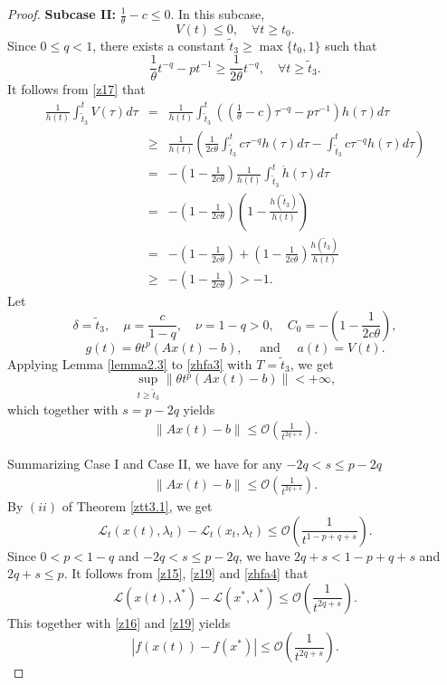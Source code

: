 \documentclass[review]{elsarticle}
\begin{document}
\begin{proof}
	{\bf Subcase II:}  $\frac{1}{\theta}-c\leq0$. In this subcase, 
	$$V(t)\leq0,  \quad \forall t\geq t_0.$$ 
	Since  $0\leq q<1$,  there exists a constant $\tilde{t}_3\geq \max\{t_0,1\}$ such that 
	$$\frac{1}{\theta}t^{-q}-pt^{-1}\geq\frac{1}{2\theta}t^{-q}, \quad \forall t\geq\tilde{t}_3.$$
It follows from \eqref{z17} that
	\begin{eqnarray*}
		\frac{1}{h(t)}\int_{\tilde{t}_3}^{t}V(\tau)d\tau&=&\frac{1}{h(t)}\int_{\tilde{t}_3}^{t}\left(\left(\frac{1}{\theta}-c\right)\tau^{-q}-p\tau^{-1}\right)h(\tau)d\tau\\
		&\geq&\frac{1}{h(t)}\left(\frac{1}{2c\theta}\int_{\tilde{t}_3}^{t}c\tau^{-q}h(\tau)d\tau-\int_{\tilde{t}_3}^{t}c\tau^{-q}h(\tau)d\tau\right)\\
		&=&-\left(1-\frac{1}{2c\theta}\right)\frac{1}{h(t)}\int_{\tilde{t}_3}^{t}\dot{h}(\tau)d\tau\\
		&=&-\left(1-\frac{1}{2c\theta}\right)\left(1-\frac{h(\tilde{t}_3)}{h(t)}\right)\\
		&=&-\left(1-\frac{1}{2c\theta}\right)+\left(1-\frac{1}{2c\theta}\right)\frac{h(\tilde{t}_3)}{h(t)}\\
		&\geq&-\left(1-\frac{1}{2c\theta}\right)>-1.
	\end{eqnarray*}	
Let
$$\delta=\tilde{t}_3,\quad \mu=\frac{c}{1-q},\quad \nu=1-q>0, \quad C_0=-\left(1-\frac{1}{2c\theta}\right),$$
$$g(t)=\theta  t^{p}(Ax(t)-b),\quad\text{ and } \quad a(t)=V(t).$$
	Applying Lemma \ref{lemma2.3}  to \eqref{zhfa3} with  $T=\tilde{t}_3$,
	we get
	$$\sup_{t\geq \tilde{t}_3}\|\theta t^{p}(Ax(t)-b)\|<+\infty,$$
	which together with $s=p-2q$ yields 
	\begin{eqnarray*}
		\|Ax(t)-b\|\leq\mathcal{O}\left(\frac{1}{t^{2q+s}}\right).
	\end{eqnarray*}	
	
	Summarizing  Case I and Case II, we have for any $-2q<s\leq p-2q$
	\begin{eqnarray}\label{z19}
		\|Ax(t)-b\|\leq\mathcal{O}\left(\frac{1}{t^{2q+s}}\right).
	\end{eqnarray}	
By $(ii)$ of Theorem \ref{ztt3.1}, we get 
	\begin{equation}\label{zhfa4}
\mathcal{L}_{t}(x(t),\lambda_t)-\mathcal{L}_{t}(x_t,\lambda_t)\leq\mathcal{O}\left(\frac{1}{t^{1-p+q+s}}\right).
\end{equation}
Since $0<p<1-q$ and $-2q<s\leq p-2q$, we have $2q+s<1-p+q+s$ and $2q+s\leq p$. It follows from \eqref{z15}, \eqref{z19} and \eqref{zhfa4} that
	$$\mathcal{L}(x(t),\lambda^*)-\mathcal{L}(x^*,\lambda^*)\leq\mathcal{O}\left(\frac{1}{t^{2q+s}}\right).$$
This together with \eqref{z16} and \eqref{z19} yields
	$$|f(x(t))-f(x^*)|\leq\mathcal{O}\left(\frac{1}{t^{2q+s}}\right).$$
   \end{proof}
	
\end{document}
